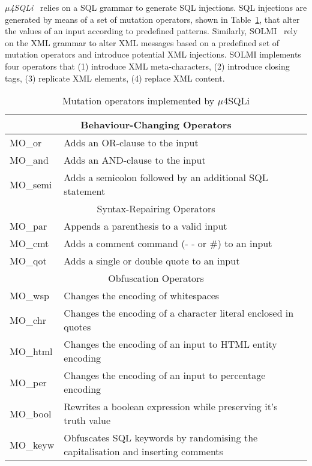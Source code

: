 

\emph{$\mu$4SQLi}~\cite{Appelt:SQLI:ISSTA:2014} relies on a SQL grammar to generate SQL injections. 
SQL injections are generated by means of a set of mutation operators, shown in Table~\ref{table:Mu4SQLI}, that alter the values of an input according to predefined patterns.
Similarly, SOLMI~\cite{Jan:ISSTA:2016} rely on the XML grammar to alter XML messages based on a predefined set of mutation operators and introduce potential XML injections. 
SOLMI implements four operators that (1) introduce XML meta-characters, (2) introduce closing tags, (3) replicate XML elements, (4) replace XML content.


\begin{table}[h]
\caption{Mutation operators implemented by $\mu$4SQLi}
\label{table:Mu4SQLI}
\begin{tabular}{|p{2cm}|p{11.5cm}|}
\hline
\multicolumn{2}{|c|}{Behaviour-Changing Operators}\\
\hline
MO\_or&Adds an OR-clause to the input\\
MO\_and&Adds an AND-clause to the input\\
MO\_semi&Adds a semicolon followed by an additional SQL statement\\
\hline
\multicolumn{2}{|c|}{Syntax-Repairing Operators}\\
\hline
MO\_par&Appends a parenthesis to a valid input\\
MO\_cmt&Adds a comment command (- - or \#) to an input\\
MO\_qot&Adds a single or double quote to an input\\
\hline
\multicolumn{2}{|c|}{Obfuscation Operators}\\
\hline
MO\_wsp&Changes the encoding of whitespaces \\
MO\_chr&Changes the encoding of a character literal enclosed in quotes\\
MO\_html&Changes the encoding of an input to HTML entity encoding\\
MO\_per&Changes the encoding of an input to percentage encoding\\
MO\_bool&Rewrites a boolean expression while preserving it's truth value\\
MO\_keyw&Obfuscates SQL keywords by randomising the capitalisation and inserting comments\\
\hline
\end{tabular}
\end{table}

